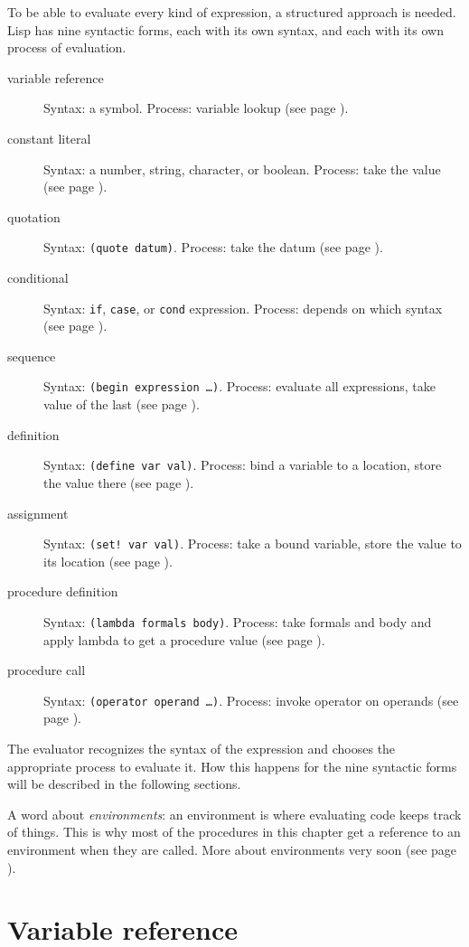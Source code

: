 \documentclass[twoside]{report}
\begin{document}
To be able to evaluate every kind of expression, a structured approach is needed. Lisp has nine syntactic forms, each with its own syntax, and each with its own process of evaluation.

\begin{description}
\item[variable reference] Syntax: a symbol. Process: variable lookup (see page \pageref{variable-reference}).
\item[constant literal] Syntax: a number, string, character, or boolean. Process: take the value (see page \pageref{constant-literal}).
\item[quotation] Syntax: \texttt{(quote datum)}. Process: take the datum (see page \pageref{quotation}).
\item[conditional] Syntax: \texttt{if}, \texttt{case}, or \texttt{cond} expression. Process: depends on which syntax (see page \pageref{conditional}).
\item[sequence] Syntax: \texttt{(begin expression \ldots )}. Process: evaluate all expressions, take value of the last (see page \pageref{sequence}).
\item[definition] Syntax: \texttt{(define var val)}. Process: bind a variable to a location, store the value there (see page \pageref{definition}).
\item[assignment] Syntax: \texttt{(set! var val)}. Process: take a bound variable, store the value to its location (see page \pageref{assignment}).
\item[procedure definition] Syntax: \texttt{(lambda formals body)}. Process: take formals and body and apply lambda to get a procedure value (see page \pageref{procedure-definition}).
\item[procedure call] Syntax: \texttt{(operator operand \ldots )}. Process: invoke operator on operands (see page \pageref{procedure-call}).
\end{description}

The evaluator recognizes the syntax of the expression and chooses the appropriate process to evaluate it. How this happens for the nine syntactic forms will be described in the following sections.

A word about \emph{environments}: an environment is where evaluating code keeps track of things. This is why most of the procedures in this chapter get a reference to an environment when they are called. More about environments very soon (see page \pageref{environments}).

\section{Variable reference}
\label{variable-reference}
\end{document}
